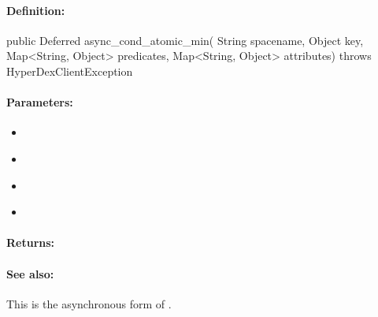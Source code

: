 \paragraph{Definition:}
\begin{javacode}
public Deferred async_cond_atomic_min(
        String spacename,
        Object key,
        Map<String, Object> predicates,
        Map<String, Object> attributes) throws HyperDexClientException
\end{javacode}

\paragraph{Parameters:}
\begin{itemize}[noitemsep]
\item {}\\

\item {}\\

\item {}\\

\item {}\\

\end{itemize}

\paragraph{Returns:}


\paragraph{See also:}  This is the asynchronous form of .

\pagebreak
\subsubsection{}
\label{api:java:group_atomic_max}



